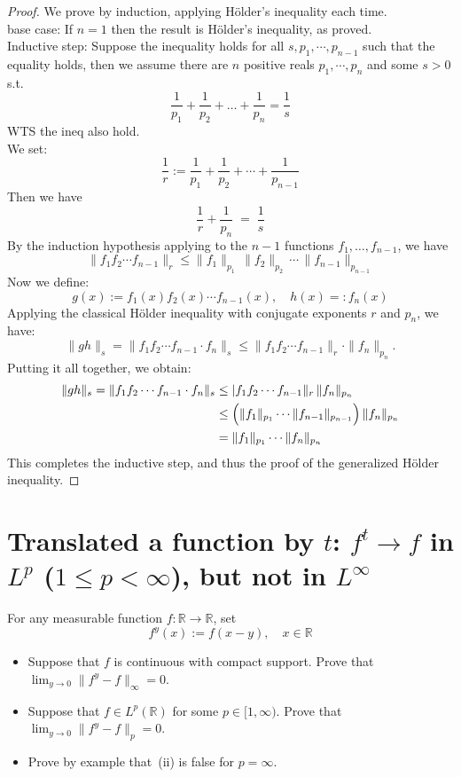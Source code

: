 \documentclass[lang=cn,11pt]{elegantbook}
\begin{document}
\begin{proof}
We prove by induction, applying Hölder's inequality each time.\\
base case: If \( n = 1 \) then the result is Hölder's inequality, as proved.\\
Inductive step: Suppose the inequality holds for all $s,p_1,\cdots, p_{n-1}$ such that the equality holds, then we assume there are $n$ positive reals $p_1, \cdots, p_n$ and some $s>0$ s.t. \[
  \frac1{p_1}+\frac1{p_2}+\dots+\frac1{p_n}=\frac1{s}
\]
WTS the ineq also hold.\\
We set: \[
  \frac{1}{r} := \frac{1}{p_1} + \frac{1}{p_2} + \cdots + \frac{1}{p_{n-1}}
\]
Then we have \[
\frac{1}{r} + \frac{1}{p_n} \;=\; \frac{1}{s}
\]
By the induction hypothesis applying to the \(n-1\) functions \(f_1, \dots, f_{n-1}\), we have
\[
  \|f_1 f_2 \cdots f_{n-1}\|_r \leq 
  \|f_1\|_{p_1}\,\|f_2\|_{p_2}\,\cdots\,\|f_{n-1}\|_{p_{n-1}}
\]
Now we define: \[g(x) := f_1(x)f_2(x)\cdots f_{n-1}(x) ,\quad h(x) =: f_n(x)\]
Applying the classical Hölder inequality with conjugate exponents \(r\) and \(p_n\), we have:
\[   \|g h\|_s =
  \|f_1 f_2 \cdots f_{n-1} \cdot f_n\|_s \leq 
  \|f_1 f_2 \cdots f_{n-1}\|_r \cdot \|f_n\|_{p_n}.
\]
Putting it all together, we obtain: 
\begin{align*}
 \|g h\|_s =
  \|f_1 f_2 \cdots f_{n-1} \cdot f_n\|_s  & \leq   |f_1 f_2 \cdots f_{n-1}\|_r \,\|f_n\|_{p_n} \\ &\leq  \Bigl(\|f_1\|_{p_1}\cdots \|f_{n-1}\|_{p_{n-1}}\Bigr)\,\|f_n\|_{p_n} \\ 
  &= \|f_1\|_{p_1} \cdots \|f_n\|_{p_n}
\end{align*}This completes the inductive step, and thus the proof of the generalized Hölder inequality. 
\end{proof}





\section{Translated a function by $t$: $f^t \to f$ in $L^p$ ($1\leq p < \infty$), but not in $L^\infty$}
  For any measurable function $f\colon\mathbb{R}\to\mathbb{R}$, set  \[
    f^y(x):=f(x-y),\quad x\in \mathbb{R}
  \]
  \begin{itemize}
  \item[(i)]    Suppose that $f$ is continuous with compact support. Prove that $\lim_{y\to0}\|f^y-f\|_\infty=0$.
  \item[(ii)]    Suppose that $f\in L^p(\mathbb{R})$ for some $p\in[1,\infty)$. Prove that $\lim_{y\to0}\|f^y-f\|_p=0$.
  \item[(iii)]    Prove by example that~(ii) is false for $p=\infty$.
  \end{itemize}
\end{document}
